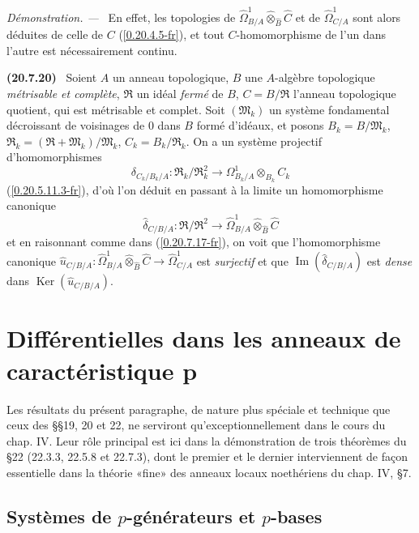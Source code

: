 \documentclass[10pt,oneside]{book}
\makeatletter
\newcommand{\sref}[1]{(\ref{#1})}
\newcommand{\setmanualcurrentlabel}[1]{\def\@currentlabel{#1}}
\newcommand{\oldpage}[2][]{%
  \setcounter{footnote}{0}%
  \marginpar{\scriptsize\textbf{#1}~|~#2}\ignorespaces}
\newenvironment{env}[1][]{\setmanualcurrentlabel{#1}\par\medskip\noindent\textbf{(#1)}\ }{\par}
\newenvironment{proof}{%
  \par\medskip\noindent\textit{Démonstration. ---\ }}{\par}
\makeatother
\begin{document}
\begin{proof}
En effet, les topologies de
$\widehat{\Omega}^1_{B/A}\widehat\otimes_{\widehat B}\widehat C$ et de
$\widehat{\Omega}^1_{C/A}$ sont alors déduites de celle de $C$
\sref{0.20.4.5-fr}, et tout $C$-homomorphisme de l'un dans l'autre est
nécessairement continu.
\end{proof}

\begin{env}[20.7.20]
\label{0.20.7.20-fr}
Soient $A$ un anneau topologique, $B$ une $A$-algèbre topologique
\emph{métrisable et complète}, $\mathfrak{R}$ un idéal \emph{fermé} de $B$,
$C=B/\mathfrak{R}$ l'anneau topologique quotient, qui est métrisable et
complet. Soit $(\mathfrak{M}_k)$ un système fondamental décroissant de
voisinages de $0$ dans $B$ formé d'idéaux, et posons
$B_k=B/\mathfrak{M}_k$,
$\mathfrak{R}_k=(\mathfrak{R}+\mathfrak{M}_k)/\mathfrak{M}_k$,
$C_k=B_k/\mathfrak{R}_k$. On a un système projectif d'homomorphismes
\[
  \delta_{C_k/B_k/A}:\mathfrak{R}_k/\mathfrak{R}_k^2\to
  \Omega^1_{B_k/A}\otimes_{B_k}C_k
\]
\sref{0.20.5.11.3-fr}, d'où l'on déduit en passant à la limite un
homomorphisme canonique
\[
  \widehat\delta_{C/B/A}:\mathfrak{R}/\mathfrak{R}^2\to
  \widehat{\Omega}^1_{B/A}\widehat\otimes_{\widehat B}\widehat C
\]
et en raisonnant comme dans \sref{0.20.7.17-fr}, on voit que l'homomorphisme
canonique
$\widehat u_{C/B/A}:\widehat{\Omega}^1_{B/A}
\widehat\otimes_{\widehat B}\widehat C\to\widehat{\Omega}^1_{C/A}$ est
\emph{surjectif} et que $\operatorname{Im}(\widehat\delta_{C/B/A})$ est
\emph{dense} dans $\operatorname{Ker}(\widehat u_{C/B/A})$.
\end{env}


%
\section{Différentielles dans les anneaux de caractéristique p}
Les résultats du présent paragraphe, de nature plus spéciale et technique que
ceux des §§19, 20 et 22, ne serviront qu'exceptionnellement dans le cours du
chap. IV. Leur rôle principal est ici dans la démonstration de trois théorèmes
du §22 (22.3.3, 22.5.8 et 22.7.3), dont le premier et le dernier interviennent
de façon essentielle dans la théorie «fine» des anneaux locaux noethériens du
chap. IV, §7.
\oldpage[0\textsubscript{IV-1}]{154}
\subsection{Systèmes de $p$-générateurs et $p$-bases}
\label{0.21.1-fr}
\end{document}
